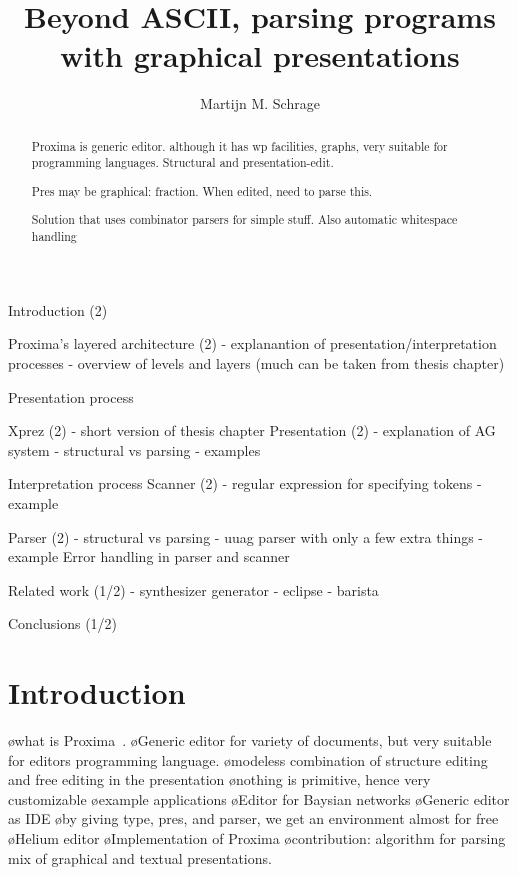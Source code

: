 \documentclass[12pt]{article}
\title{Beyond ASCII, parsing programs with graphical presentations \\{\small \version}}
\author{Martijn M. Schrage\inst{1}}
\begin{document}
 

\maketitle

\begin{abstract}
Proxima is generic editor. although it has wp facilities, graphs, very suitable for programming languages. Structural and presentation-edit.

Pres may be graphical: fraction. When edited, need to parse this.

Solution that uses combinator parsers for simple stuff. Also automatic whitespace handling
\end{abstract}
     
\bc

Introduction (2)

Proxima's layered architecture (2)
- explanantion of presentation/interpretation processes
- overview of levels and layers
  (much can be taken from thesis chapter)
  
Presentation process
  
  Xprez (2)
  - short version of thesis chapter
  Presentation (2)
  - explanation of AG system
  - structural vs parsing
  - examples
   
Interpretation process 
  Scanner (2)
  - regular expression for specifying tokens
  - example
 
  Parser  (2)
   - structural vs parsing
   - uuag parser with only a few extra things
   - example
  Error handling in parser and scanner
 
Related work (1/2)
- synthesizer generator
- eclipse
- barista

Conclusions (1/2)

\ec

\section{Introduction}

\bl
\o what is Proxima~\cite{schrage04Proxima}.
\o Generic editor for variety of documents, but very suitable for editors programming language.
\o modeless combination of structure editing and free editing in the presentation
\o nothing is primitive, hence very customizable
\o example applications
\o Editor for Baysian networks
\o Generic editor as IDE
\o by giving type, pres, and parser, we get an environment almost for free
\o Helium editor
\o Implementation of Proxima
\el
\bl
\o contribution: algorithm for parsing mix of graphical and textual presentations.
\el
\end{document}
